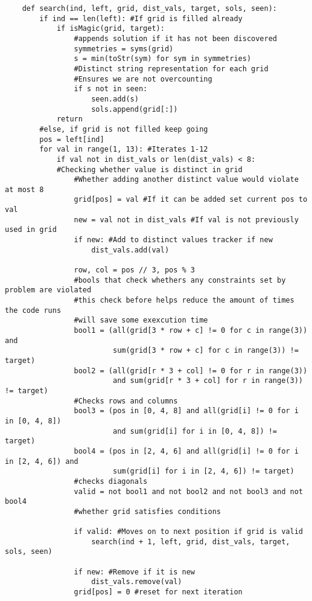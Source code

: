 \documentclass[11pt, letterpaper]{article}
\begin{document}
\begin{solution}{2}
\begin{verbatim}
    def search(ind, left, grid, dist_vals, target, sols, seen):
        if ind == len(left): #If grid is filled already
            if isMagic(grid, target): 
                #appends solution if it has not been discovered
                symmetries = syms(grid)
                s = min(toStr(sym) for sym in symmetries)
                #Distinct string representation for each grid
                #Ensures we are not overcounting
                if s not in seen:
                    seen.add(s)
                    sols.append(grid[:])
            return
        #else, if grid is not filled keep going
        pos = left[ind]
        for val in range(1, 13): #Iterates 1-12
            if val not in dist_vals or len(dist_vals) < 8:
            #Checking whether value is distinct in grid
                #Whether adding another distinct value would violate at most 8
                grid[pos] = val #If it can be added set current pos to val
                new = val not in dist_vals #If val is not previously used in grid
                if new: #Add to distinct values tracker if new
                    dist_vals.add(val)
    
                row, col = pos // 3, pos % 3
                #bools that check whethers any constraints set by problem are violated
                #this check before helps reduce the amount of times the code runs
                #will save some exexcution time
                bool1 = (all(grid[3 * row + c] != 0 for c in range(3)) and 
                         sum(grid[3 * row + c] for c in range(3)) != target)
                bool2 = (all(grid[r * 3 + col] != 0 for r in range(3)) 
                         and sum(grid[r * 3 + col] for r in range(3)) != target)
                #Checks rows and columns
                bool3 = (pos in [0, 4, 8] and all(grid[i] != 0 for i in [0, 4, 8]) 
                         and sum(grid[i] for i in [0, 4, 8]) != target)
                bool4 = (pos in [2, 4, 6] and all(grid[i] != 0 for i in [2, 4, 6]) and 
                         sum(grid[i] for i in [2, 4, 6]) != target)
                #checks diagonals
                valid = not bool1 and not bool2 and not bool3 and not bool4 
                #whether grid satisfies conditions
    
                if valid: #Moves on to next position if grid is valid
                    search(ind + 1, left, grid, dist_vals, target, sols, seen)
        
                if new: #Remove if it is new
                    dist_vals.remove(val)
                grid[pos] = 0 #reset for next iteration
    

\end{verbatim}
\end{solution}
\end{document}

